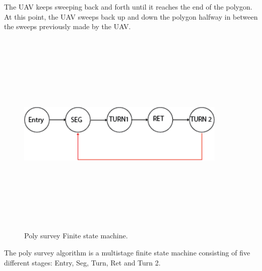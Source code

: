 The UAV keeps sweeping back and forth until it reaches the end of the polygon. At this point, the UAV sweeps back up and down the polygon halfway in between the sweeps previously made by the UAV. 
\begin{figure}[H]
\centering
\includegraphics[width=10cm,height=10cm,keepaspectratio]{imagenes/FSM.png}
\caption{Poly survey Finite state machine.}
\label{fig:FSM}
\end{figure}

The poly survey algorithm is a multistage finite state machine consisting of five different stages: Entry, Seg, Turn, Ret and Turn 2.
